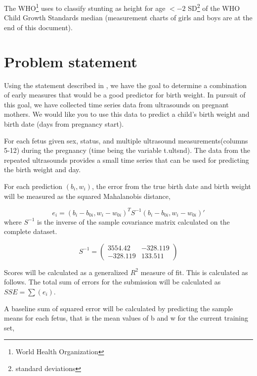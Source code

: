 \documentclass[10pt,twocolumn,letterpaper]{article}
\begin{document}
The WHO\footnote{World Health Organization} uses to classify stunting as height for age $< -2$ SD\footnote{standard deviations} of the WHO Child Growth Standards median (measurement charts of girls and boys are at the end of this document).

\section{Problem statement}


Using the statement described in \cite{topcoder}, we have the goal to determine a combination of early measures that would be a good predictor for birth weight. In pursuit of this goal, we have collected time series data from ultrasounds on pregnant mothers. We would like you to use this data to predict a child’s birth weight and birth date (days from pregnancy start).

For each fetus given sex, status, and multiple ultrasound measurements(columns 5-12) during the pregnancy (time being the variable t.ultsnd). The data from the repeated ultrasounds provides a small time series that can be used for predicting the birth weight and day.

For each prediction $(b_i, w_i)$, the error from the true birth date and birth weight will be measured as the squared Mahalanobis distance,

\begin{equation}
e_i = (b_i - b_{0i}, w_i - w_{0i})^TS^{-1}(b_i - b_{0i}, w_i - w_{0i})'
\label{eq:Mahalanobis}
\end{equation}
where $S^{-1}$ is the inverse of the sample covariance matrix calculated on the complete dataset.

\begin{equation}
S^{-1} = \left( \begin{array}{cc}
3554.42 & -328.119 \\
-328.119 &  133.511 
\end{array} \right)
\label{eq:S1}
\end{equation}

Scores will be calculated as a generalized $R^2$ measure of fit. This is calculated as follows. The total sum of errors for the submission will be calculated as $SSE = \sum(e_i)$.

A baseline sum of squared error will be calculated by predicting the sample means for each fetus, that is the mean values of b and w for the current training set,
\end{document}
